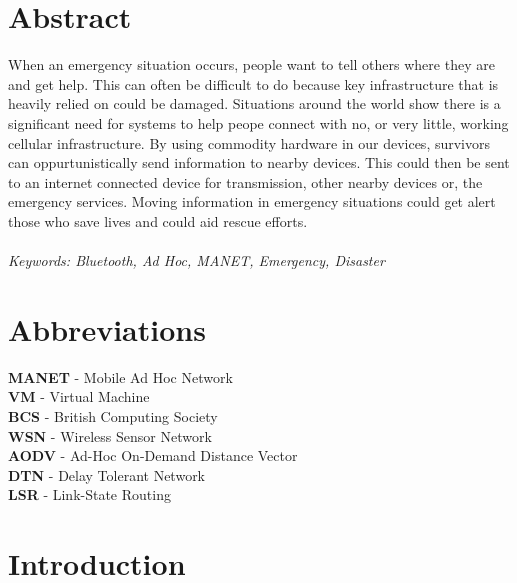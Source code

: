\documentclass{report}
\begin{document}
\chapter*{Abstract}

When an emergency situation occurs, people want to tell others where they are and get help. 
This can often be difficult to do because key infrastructure that is heavily relied on could be damaged.
Situations around the world show there is a significant need for systems to help peope connect with no, or very little, working cellular infrastructure. 
By using commodity hardware in our devices, survivors can oppurtunistically send information to nearby devices. 
This could then be sent to an internet connected device for transmission, other nearby devices or, the emergency services. 
Moving information in emergency situations could get alert those who save lives and could aid rescue efforts.
\\
\\
\textit{Keywords: Bluetooth, Ad Hoc, MANET, Emergency, Disaster}



\chapter*{Abbreviations}

\textbf{MANET} - Mobile Ad Hoc Network\\
\textbf{VM} - Virtual Machine\\
\textbf{BCS} - British Computing Society\\
\textbf{WSN} - Wireless Sensor Network\\
\textbf{AODV} - Ad-Hoc On-Demand Distance Vector\\
\textbf{DTN} - Delay Tolerant Network\\
\textbf{LSR} - Link-State Routing\\




\chapter*{Introduction}
\end{document}
